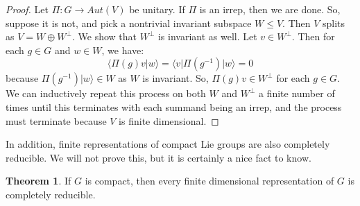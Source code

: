 \documentclass[11pt, oneside]{article}   	%
\theoremstyle{definition}
\newtheorem{theorem}{Theorem}[section]
\begin{document}
\begin{proof}
	Let $\Pi : G\rightarrow Aut(V)$ be unitary. If $\Pi$ is an irrep, then we are done. So, suppose it is not, and pick 
	a nontrivial invariant subspace $W\leq V$. Then $V$ splits as $V = W\oplus W^\perp$. We show that $W^\perp$ 
	is invariant as well. Let $v\in W^\perp$. Then for each $g\in G$ and $w\in W$, we have:
	\begin{equation}
		\langle \Pi(g)v|w\rangle = \langle v | \Pi(g^{-1}) |w\rangle = 0
	\end{equation}
	because $\Pi(g^{-1})|w\rangle\in W$ as $W$ is invariant. So, $\Pi(g)v\in W^\perp$ for each $g\in G$. We 
	can inductively repeat this process on both $W$ and $W^\perp$ a finite number of times until this terminates 
	with each summand being an irrep, and the process must terminate because $V$ is finite dimensional. 
\end{proof}

In addition, finite representations of compact Lie groups are also completely reducible. We will not prove this, but it 
is certainly a nice fact to know.

\begin{theorem}
	If $G$ is compact, then every finite dimensional representation of $G$ is completely reducible.
\end{theorem}
\end{document}
